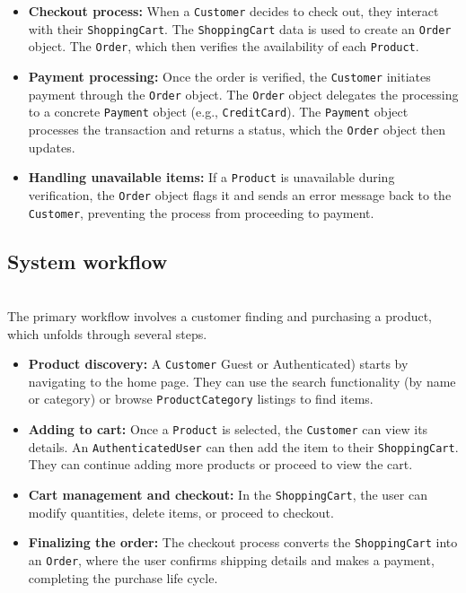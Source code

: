 \begin{itemize}
\item
\protect{}\label{gE3nnsxp3cKuonK0ht2fI}
\textbf{Checkout process:} When a \texttt{Customer} decides to check out, they interact with their \texttt{ShoppingCart}. The \texttt{ShoppingCart} data is used to create an \texttt{Order} object. The \texttt{Order}, which then verifies the availability of each \texttt{Product}.
\item
\protect{}\label{DS76aVzsW09RboXpC2F07}
\textbf{Payment processing:} Once the order is verified, the \texttt{Customer} initiates payment through the \texttt{Order} object. The \texttt{Order} object delegates the processing to a concrete \texttt{Payment} object (e.g., \texttt{CreditCard}). The \texttt{Payment} object processes the transaction and returns a status, which the \texttt{Order} object then updates.
\item
\protect{}\label{2PyJzx1HhHGA8QlcUEVIW}
\textbf{Handling unavailable items:} If a \texttt{Product} is unavailable during verification, the \texttt{Order} object flags it and sends an error message back to the \texttt{Customer}, preventing the process from proceeding to payment.
\end{itemize}

\subsection{System workflow}\label{O4rO-uGw6xV9JtI6okNLA}
\\
The primary workflow involves a customer finding and purchasing a product, which unfolds through several steps.

\begin{itemize}
\item
\protect{}\label{i9vxGTxdG77_4mI9g5b-b}
\textbf{Product discovery:} A \texttt{Customer} Guest or Authenticated) starts by navigating to the home page. They can use the search functionality (by name or category) or browse \texttt{ProductCategory} listings to find items.
\item
\protect{}\label{JxAl4pqO47vqUI__sYjF5}
\textbf{Adding to cart:} Once a \texttt{Product} is selected, the \texttt{Customer} can view its details. An \texttt{AuthenticatedUser} can then add the item to their \texttt{ShoppingCart}. They can continue adding more products or proceed to view the cart.
\item
\protect{}\label{H5rNDyTCjW6sNqbdnL1LY}
\textbf{Cart management and checkout:} In the \texttt{ShoppingCart}, the user can modify quantities, delete items, or proceed to checkout.
\item
\protect{}\label{dDy1VDys9Zxg4wLxLEy6h}
\textbf{Finalizing the order:} The checkout process converts the \texttt{ShoppingCart} into an \texttt{Order}, where the user confirms shipping details and makes a payment, completing the purchase life cycle.
\end{itemize}

